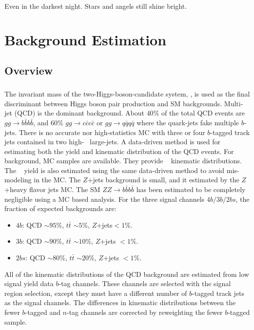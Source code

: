 \begin{savequote}[75mm]
Even in the darkest night. Stars and angels still shine bright.   
\end{savequote}


\chapter{Background Estimation}

\section{Overview}
\paragraph{}
The invariant mass of the two-Higgs-boson-candidate system, \mtwoJ, is used as the final discriminant between Higgs boson pair production and SM backgrounds.
Multi-jet (QCD) is the dominant background.
About $40\%$ of the total QCD events are $gg \to b\bar{b}b\bar{b}$, and $60\%$ $gg \to c\bar{c}c\bar{c}$ or $gg \to q\bar{q}q\bar{q}$ where the quark-jets fake multiple $b$-jets.
There is no accurate nor high-statistics MC with three or four $b$-tagged track jets contained in two high-\pt~ large-\R jets.
A data-driven method is used for estimating both the yield and kinematic distribution of the QCD events.
For \ttbar~ background, MC samples are available. 
They provide \ttbar~ kinematic distributions.
The \ttbar~ yield is also estimated using the same data-driven method to avoid mis-modeling in the MC.
The $Z$+jets background is small, and it estimated by the $Z$+heavy flavor jets MC.
The SM $ZZ\to b\bar{b}b\bar{b}$ has been estimated to be completely negligible using a MC based analysis.
For the three signal channels $4b/3b/2bs$, the fraction of expected backgrounds are:
\begin{itemize}
	\item $4b$: QCD $\sim 95\%$, $t\bar{t}$ $\sim 5\%$, $Z$+jets$< 1\%$. 
	\item $3b$: QCD $\sim 90\%$, $t\bar{t}$ $\sim 10\%$, $Z$+jets $< 1\%$.  
	\item $2bs$: QCD $\sim 80\%$, $t\bar{t}$ $\sim 20\%$, $Z$+jets $< 1\%$.
\end{itemize}

All of the kinematic distributions of the QCD background are estimated from low signal yield data $b$-tag channels.
These channels are selected with the signal region selection, except they must have a different number of $b$-tagged track jets as the signal channels.
The differences in kinematic distributions between the fewer $b$-tagged and $n$-tag channels are corrected by reweighting the fewer $b$-tagged sample.

